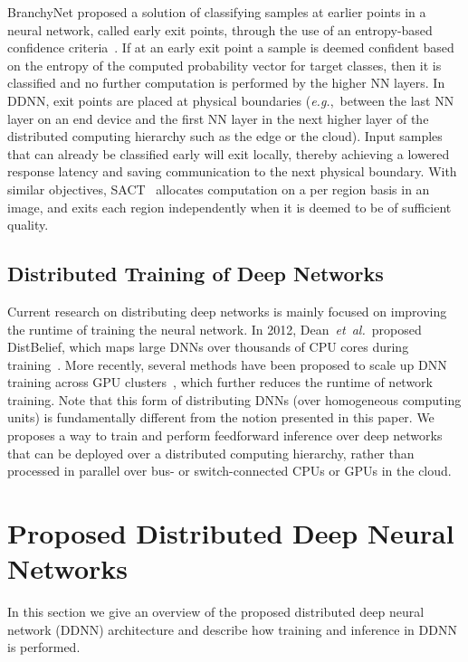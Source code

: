 \documentclass[10pt, conference, compsocconf]{IEEEtran}
\newcommand{\eg}{\emph{e.g.}}
\newcommand{\etal}{\emph{et~al.}}
\begin{document}
BranchyNet proposed a solution of classifying samples at earlier points in a neural network, called early exit points, through the use of an entropy-based confidence criteria~\cite{teerapittayanon2016branchynet}. If at an early exit point a sample is deemed confident based on the entropy of the computed probability vector for target classes, then it is classified and no further computation is performed by the higher NN layers. In DDNN, exit points are placed at physical boundaries (\eg,~between the last NN layer on an end device and the first NN layer in the next higher layer of the distributed computing hierarchy such as the edge or the cloud). Input samples that can already be classified early will exit locally, thereby achieving a lowered response latency and saving communication to the next physical boundary. With similar objectives, SACT~\cite{figurnov2016sact} allocates computation on a per region basis in an image, and exits each region independently when it is deemed to be of sufficient quality. 

\subsection{Distributed Training of Deep Networks}
Current research on distributing deep networks is mainly focused on improving the runtime of training the neural network. In 2012, Dean~\etal~proposed DistBelief, which maps large DNNs over thousands of CPU cores during training~\cite{dean2012large}. More recently, several methods have been proposed to scale up DNN training across GPU clusters~\cite{iandola2015firecaffe, dean2015large}, which further reduces the runtime of network training. Note that this form of distributing DNNs (over homogeneous computing units) is fundamentally different from the notion presented in this paper. We proposes a way to train and perform feedforward inference over deep networks that can be deployed over a distributed computing hierarchy, rather than processed in parallel over bus- or switch-connected CPUs or GPUs in the cloud.

\section{Proposed Distributed Deep Neural Networks}
In this section we give an overview of the proposed distributed deep neural network (DDNN) architecture and describe how training and inference in DDNN is performed.
\end{document}
